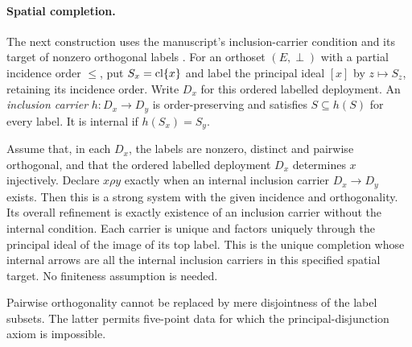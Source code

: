 \paragraph{Spatial completion.}
The next construction uses the manuscript's inclusion-carrier
condition \cite[part~9, archive sheet~45, PDF p.~46]{Groth}
and its target of nonzero orthogonal labels
\cite[archive sheet~47, PDF p.~48]{Groth}.
For an orthoset $(E,\perp)$ with a partial incidence order $\leq$,
put $S_x=\operatorname{cl}\{x\}$ and label the principal ideal $[x]$ by
$z\mapsto S_z$, retaining its incidence order. Write $D_x$ for
this ordered labelled deployment. An \emph{inclusion carrier}
$h:D_x\to D_y$ is order-preserving and satisfies $S\subseteq h(S)$
for every label. It is internal if $h(S_x)=S_y$.

\begin{theorem}\label{thm:spatial-completion}
Assume that, in each $D_x$, the labels are nonzero, distinct and
pairwise orthogonal, and that the ordered labelled deployment
$D_x$ determines $x$ injectively. Declare $x\rho y$ exactly when
an internal inclusion carrier $D_x\to D_y$ exists. Then this is
a strong system with the given incidence and orthogonality.
Its overall refinement is exactly existence of an inclusion
carrier without the internal condition. Each carrier is unique
and factors uniquely through the principal ideal of the image
of its top label. This is the unique completion whose internal
arrows are all the internal inclusion carriers in this specified
spatial target. No finiteness assumption is needed.

Pairwise orthogonality cannot be replaced by mere disjointness
of the label subsets. The latter permits five-point data for
which the principal-disjunction axiom is impossible.
\end{theorem}

